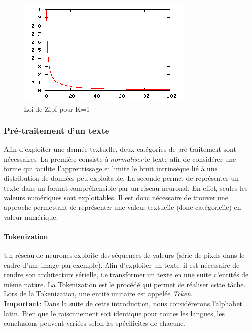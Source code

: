 \begin{figure}
\centering
\includegraphics[scale=0.4]{./tex/natural-language-processing/zipf.png}
\caption{Loi de Zipf pour K=1}
\label{zipf}
\end{figure}

\subsubsection{Pré-traitement d'un texte}
Afin d'exploiter une donnée textuelle, deux catégories de pré-traitement sont nécessaires. La première consiste à \textit{normaliser} le texte afin de considérer une forme qui facilite l'apprentissage et limite le bruit intrinsèque lié à une distribution de données peu exploitable. La seconde permet de représenter un texte dans un format compréhensible par un réseau neuronal. En effet, seules les valeurs numériques sont exploitables. Il est donc nécessaire de trouver une approche permettant de représenter une valeur textuelle (donc catégorielle) en valeur numérique.

\paragraph{Tokenization}
Un réseau de neurones exploite des séquences de valeurs (série de pixels dans le cadre d'une image par exemple). Afin d'exploiter un texte, il est nécessaire de rendre son architecture sérielle, i.e transformer un texte en une suite d'entités de même nature. La Tokenization est le procédé qui permet de réaliser cette tâche. Lors de la Tokenization, une entité unitaire est appelée \textit{Token}.\\

\noindent \textbf{Important}: Dans la suite de cette introduction, nous considérerons l'alphabet latin. Bien que le raisonnement soit identique pour toutes les langues, les conclusions peuvent variées selon les spécificités de chacune.\\

